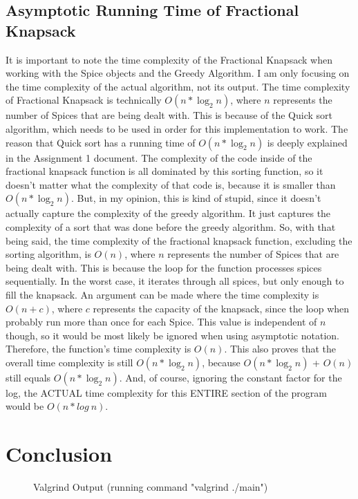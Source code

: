 \documentclass[letterpaper, 10pt]{article}
\begin{document}
\subsection{Asymptotic Running Time of Fractional Knapsack}
\noindent
It is important to note the time complexity of the Fractional Knapsack when working with the Spice objects and the Greedy Algorithm. I am only focusing on the time complexity of the actual algorithm, not its output. The time complexity of Fractional Knapsack is technically $O(n * \log_2n)$, where $n$ represents the number of Spices that are being dealt with. This is because of the Quick sort algorithm, which needs to be used in order for this implementation to work. The reason that Quick sort has a running time of $O(n * \log_2n)$ is deeply explained in the Assignment 1 document. The complexity of the code inside of the fractional knapsack function is all dominated by this sorting function, so it doesn't matter what the complexity of that code is, because it is smaller than $O(n * \log_2n)$. But, in my opinion, this is kind of stupid, since it doesn't actually capture the complexity of the greedy algorithm. It just captures the complexity of a sort that was done before the greedy algorithm. So, with that being said, the time complexity of the fractional knapsack function, excluding the sorting algorithm, is $O(n)$, where $n$ represents the number of Spices that are being dealt with. This is because the loop for the function processes spices sequentially. In the worst case, it iterates through all spices, but only enough to fill the knapsack. An argument can be made where the time complexity is $O(n + c)$, where $c$ represents the capacity of the knapsack, since the loop when probably run more than once for each Spice. This value is independent of $n$ though, so it would be most likely be ignored when using asymptotic notation. Therefore, the function's time complexity is $O(n)$. This also proves that the overall time complexity is still $O(n * \log_2n)$, because $O(n * \log_2n)$ + $O(n)$ still equals $O(n * \log_2n)$. And, of course, ignoring the constant factor for the log, the ACTUAL time complexity for this ENTIRE section of the program would be $O(n * log\ n)$. 

\section{Conclusion}
\setcounter{figure}{0}
\begin{figure}[H] 
    \centering 
    \caption{Valgrind Output (running command "valgrind ./main")}
    \label{fig:figure4.1}
\end{figure}
\end{document}
